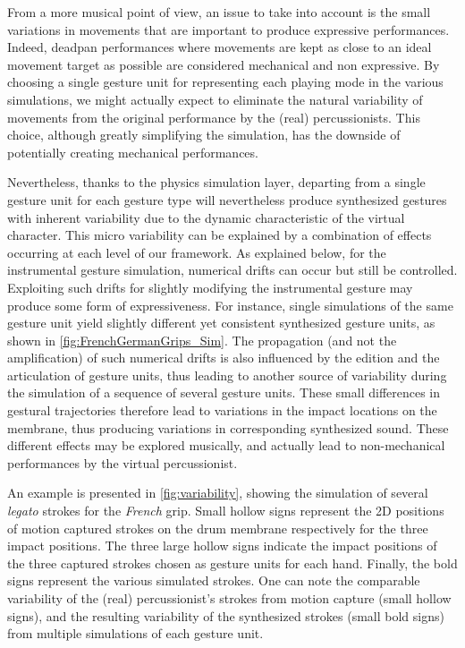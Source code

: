 From a more musical point of view, an issue to take into account is the small variations in movements that are important to produce expressive performances. Indeed, deadpan performances where movements are kept as close to an ideal movement target as possible are considered mechanical and non expressive. By choosing a single gesture unit for representing each playing mode in the various simulations, we might actually expect to eliminate the natural variability of movements from the original performance by the (real) percussionists. This choice, although greatly simplifying the simulation, has the downside of potentially creating mechanical performances.

Nevertheless, thanks to the physics simulation layer, departing from a single gesture unit for each gesture type will nevertheless produce synthesized gestures with inherent variability due to the dynamic characteristic of the virtual character. This micro variability can be explained by a combination of effects occurring at each level of our framework. As explained below, for the instrumental gesture simulation, numerical drifts can occur but still be controlled. Exploiting such drifts for slightly modifying the instrumental gesture may produce some form of expressiveness. For instance, single simulations of the same gesture unit yield slightly different yet consistent synthesized gesture units, as shown in \myfigname \ref{fig:FrenchGermanGrips_Sim}. The propagation (and not the amplification) of such numerical drifts is also influenced by the edition and the articulation of gesture units, thus leading to another source of variability during the simulation of a sequence of several gesture units. These small differences in gestural trajectories therefore lead to variations in the impact locations on the membrane, thus producing variations in corresponding synthesized sound. These different effects may be explored musically, and actually lead to non-mechanical performances by the virtual percussionist.

An example is presented in \myfigname \ref{fig:variability}, showing the simulation of several \emph{legato} strokes for the \emph{French} grip. Small hollow signs represent the 2D positions of motion captured strokes on the drum membrane respectively for the three impact positions. The three large hollow signs indicate the impact positions of the three captured strokes chosen as gesture units for each hand. Finally, the bold signs represent the various simulated strokes. One can note the comparable variability of the (real) percussionist's strokes from motion capture (small hollow signs), and the resulting variability of the synthesized strokes (small bold signs) from multiple simulations of each gesture unit.


